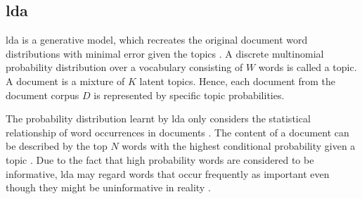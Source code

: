 
\subsection{\ac{lda}}\label{subsec:latent-dirichlet-allocation}

\ac{lda} is a generative model, which recreates the original document word distributions with minimal error given the topics \cite{topic_modeling2015, Top2Vec2020}.
A discrete multinomial probability distribution over a vocabulary consisting of $W$ words is called a topic.
A document is a mixture of $K$ latent topics.
Hence, each document from the document corpus $D$ is represented by specific topic probabilities.

The probability distribution learnt by \ac{lda} only considers the statistical relationship of word occurrences in documents \cite{Topic2Vec2015}.
The content of a document can be described by the top $N$ words with the highest conditional probability given a topic \cite{Topic2Vec2015}.
Due to the fact that high probability words are considered to be informative, \ac{lda} may regard words 
that occur frequently as important even though they might be uninformative in reality \cite{Top2Vec2020, Topic2Vec2015}.
